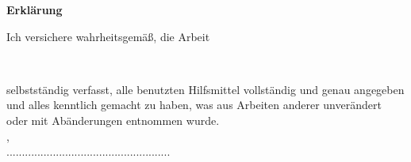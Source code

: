 

\begin{center}
{\LARGE {\textbf{Erklärung}}}\\[2.5cm]
\end{center}
Ich versichere wahrheitsgemäß, die Arbeit
\vspace{1cm}
\begin{center}
\large {\titleofthesis}\\
\vspace{1cm}
\end{center}
selbstständig verfasst, alle benutzten Hilfsmittel vollständig und genau angegeben und alles kenntlich gemacht zu haben, was aus Arbeiten anderer unverändert oder mit Abänderungen entnommen wurde.\\[2.5cm]
{\city}, {\dateofthesis}\\[0.75cm]
\hspace*{9.0cm}.....................................................\\
\hspace*{11.1cm}\name


